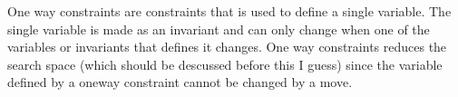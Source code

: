 One way constraints are constraints that is used to define a single variable. The single variable is made as an 
invariant and can only change when one of the variables or invariants that defines it changes. One way constraints 
reduces the search space (which should be descussed before this I guess) since the variable defined by a oneway 
constraint cannot be changed by a move. 